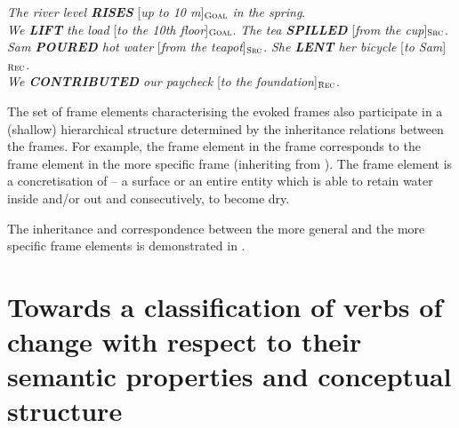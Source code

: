 \documentclass[output=paper,colorlinks,citecolor=brown]{langscibook}
\begin{document}
\begin{exe}
           \ex  \label{ex15a} \textit{The river level \textbf{RISES}} [\textit{up to 10 m}]$_{\text{\textsc{Goal}}}$ \textit{in the spring}. \\
           \textit{We \textbf{LIFT} the load} [\textit{to the 10th floor}]$_{\text{\textsc{Goal}}}$.
         \ex  \label{ex15b}  \textit{The tea \textbf{SPILLED}} [\textit{from the cup}]$_{\text{\textsc{Src}}}$.\\
         \textit{Sam \textbf{POURED} hot water} [\textit{from the teapot}]$_{\text{\textsc{Src}}}$.
\ex  \label{ex15c}  \textit{She \textbf{LENT} her bicycle} [\textit{to Sam}]$_{\text{\textsc{Rec}}}$. \\
\textit{We \textbf{CONTRIBUTED} our paycheck} [\textit{to the foundation}]$_{\text{\textsc{Rec}}}$.
\end{exe}


The set of frame elements characterising the evoked frames also participate in a (shallow) hierarchical structure determined by the inheritance relations between the frames. For example, the frame element  in the frame  corresponds to the frame element  in the more specific frame  (inheriting from ). The frame element  is a concretisation of  -- a surface or an entire entity which is able to retain water inside and/or out and consecutively, to become dry.

The inheritance and correspondence between the more general and the more specific frame elements is demonstrated in .

\section{Towards a classification of verbs of change with respect to their semantic properties and conceptual structure} \label{sec:classification}
\end{document}
